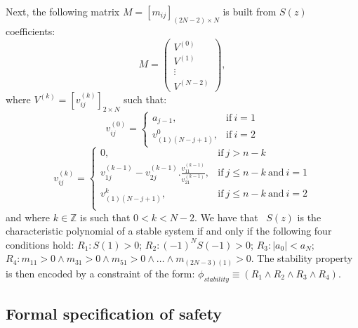 \documentclass[twocolumn]{autart}    %
\begin{document}
Next, the following matrix
$M = [m_{ij}]_{(2N-2)\times N}$ is built from $S(z)$ coefficients:
%
$$
M=\left( 
\begin{array}{c}
V^{(0)}\\
V^{(1)}\\
\vdots\\
V^{(N-2)}
\end{array}
\right), 
$$
%
where $V^{(k)} = [v^{(k)}_{ij} ]_{2\times N}$ such that:
%
$$
v_{ij}^{(0)}=\left\{
\begin{array}{ll}
a_{j-1}, & \mbox{if}~i=1\\
v_{(1)(N-j+1)}^{0},&\mbox{if}~i=2
\end{array}
\right.
$$
%
$$
v_{ij}^{(k)}=\left\{
\begin{array}{ll}
0,&\mbox{if}~j>n-k\\
v_{1j}^{(k-1)}-v_{2j}^{(k-1)} . \frac{v_{11}^{(k-1)}}{v_{21}^{(k-1)}}, & \mbox{if}~j\leq n-k ~\mbox{and}~i=1\\
v_{(1)(N-j+1)}^{k},& \mbox{if}~j\leq n-k ~\mbox{and}~i=2\\
\end{array}
\right.
$$
%
and where $k \in \mathbb{Z}$ is such that $0 < k < N - 2$. 
We have that~\cite{astrom1997computer} 
$S(z)$ is the
characteristic polynomial of a stable system if and only if the following four conditions hold:
$R_1: S(1) > 0$;
$R_2: (−1)^N S(−1) > 0$;
$R_3: |a_0| < a_N$;
$R_4: m_{11} > 0 \wedge\allowbreak
      m_{31}>0 \wedge\allowbreak
      m_{51}>0 \wedge \ldots \wedge\allowbreak
      m_{(2N{-}3)(1)}>0$.
%
The stability property is then encoded by a constraint of the form:
$
\phi_\mathit{stability} \equiv (R_1 \wedge R_2 \wedge R_3 \wedge R_4).
$


\subsection{Formal specification of safety} 
\label{ssec:safespecification}
\end{document}

